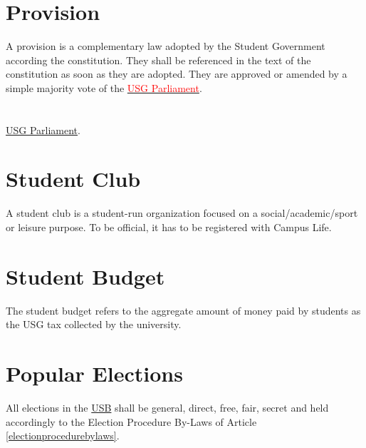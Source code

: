 \section{Provision}
A provision is a complementary law adopted by the Student Government according the constitution. They shall be referenced in the text of the constitution as soon as they are adopted. They are approved or amended by a simple majority vote of the \hyperref[USGParliamentDef]{\textcolor{red}{USG Parliament}}.

\section{}
 \protect\hyperref[USGParliamentDef]{USG Parliament}.

\section{Student Club}
A student club is a student-run organization focused on a social/academic/sport or leisure purpose. To be official, it has to be registered with Campus Life.

\section{Student Budget}
The student budget refers to the aggregate amount of money paid by students as the USG tax collected by the university.

\section{Popular Elections}
All elections in the \hyperref[studentbody]{USB} shall be general, direct, free, fair, secret and held accordingly to the Election Procedure By-Laws of Article \ref{electionprocedurebylaws}.

